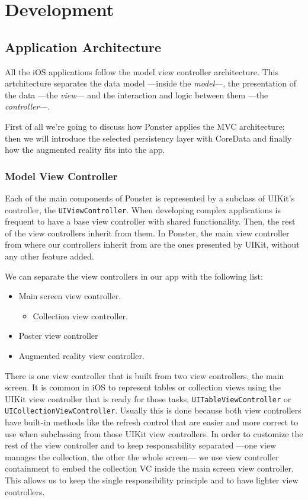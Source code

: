 \chapter{Development}
\section{Application Architecture}
\label{sec:architecture}
All the iOS applications follow the model view controller architecture. This
artchitecture separates the data model ---inside the \emph{model}---, the presentation
of the data ---the \emph{view}--- and the interaction and logic between them ---the
\emph{controller}---. 

First of all we're going to discuss how Ponster applies the MVC
architecture; then we will introduce the selected persistency layer with CoreData
and finally how the augmented reality fits into the app.

\subsection{Model View Controller}
Each of the main components of Ponster is represented by a subclass of UIKit's
controller, the \texttt{UIViewController}. When developing complex applications is
frequent to have a base view controller with shared functionality. Then, the rest of
the view controllers inherit from them. In Ponster, the main view controller from
where our controllers inherit from are the ones presented by UIKit, without any
other feature added. 

We can separate the view controllers in our app with the following list:
\begin{itemize}
\item Main screen view controller.
\begin{itemize}
\item Collection view controller.
\end{itemize}
\item Poster view controller
\item Augmented reality view controller.
\end{itemize}

There is one view controller that is built from two view controllers, the main
screen. It is common in iOS to represent tables or collection views using the UIKit
view controller that is ready for those tasks, \texttt{UITableViewController} or
\texttt{UICollectionViewController}. Usually this is done because both view
controllers have built-in methods like the refresh control that are easier and
more correct to use when subclassing from those UIKit view controllers. In order to
customize the rest of the view controller and to keep responsability separated ---one
view manages the collection, the other the whole screen--- we use
view controller containment to embed the collection VC inside the main screen view
controller. This allows us to keep the single responsibility principle and to have
lighter view controllers.

